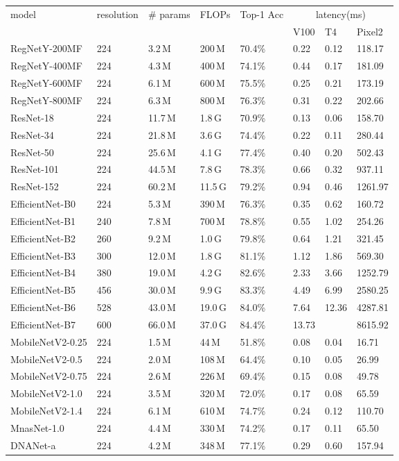 \documentclass{article}
\providecommand{\tabularnewline}{\\}
\providecommand{\tabularnewline}{\\}
\begin{document}
\begin{longtable}[c]{llllllll}
  \toprule 
\multirow{2}{*}{model} & \multirow{2}{*}{resolution} & \multirow{2}{*}{\# params} & \multirow{2}{*}{FLOPs} & \multirow{2}{*}{Top-1 Acc} & \multicolumn{3}{c}{latency(ms)}\tabularnewline
\cmidrule{6-8} \cmidrule{7-8} \cmidrule{8-8} 
 &  &  &  &  & V100 & T4 & Pixel2\tabularnewline
\midrule 
RegNetY-200MF & 224 & 3.2\,M & 200\,M & 70.4\% & 0.22 & 0.12 & 118.17\tabularnewline
\midrule 
RegNetY-400MF & 224 & 4.3\,M & 400\,M & 74.1\% & 0.44 & 0.17 & 181.09\tabularnewline
\midrule 
RegNetY-600MF & 224 & 6.1\,M & 600\,M & 75.5\% & 0.25 & 0.21 & 173.19\tabularnewline
\midrule 
RegNetY-800MF & 224 & 6.3\,M & 800\,M & 76.3\% & 0.31 & 0.22 & 202.66\tabularnewline
\midrule 
ResNet-18 & 224 & 11.7\,M & 1.8\,G & 70.9\% & 0.13 & 0.06 & 158.70\tabularnewline
\midrule 
ResNet-34 & 224 & 21.8\,M & 3.6\,G & 74.4\% & 0.22 & 0.11 & 280.44\tabularnewline
\midrule 
ResNet-50 & 224 & 25.6\,M & 4.1\,G & 77.4\% & 0.40 & 0.20 & 502.43\tabularnewline
\midrule 
ResNet-101 & 224 & 44.5\,M & 7.8\,G & 78.3\% & 0.66 & 0.32 & 937.11\tabularnewline
\midrule 
ResNet-152 & 224 & 60.2\,M & 11.5\,G & 79.2\% & 0.94 & 0.46 & 1261.97\tabularnewline
\midrule 
EfficientNet-B0 & 224 & 5.3\,M & 390\,M & 76.3\% & 0.35 & 0.62 & 160.72\tabularnewline
\midrule 
EfficientNet-B1 & 240 & 7.8\,M & 700\,M & 78.8\% & 0.55 & 1.02 & 254.26\tabularnewline
\midrule 
EfficientNet-B2 & 260 & 9.2\,M & 1.0\,G & 79.8\% & 0.64 & 1.21 & 321.45\tabularnewline
\midrule 
EfficientNet-B3 & 300 & 12.0\,M & 1.8\,G & 81.1\% & 1.12 & 1.86 & 569.30\tabularnewline
\midrule 
EfficientNet-B4 & 380 & 19.0\,M & 4.2\,G & 82.6\% & 2.33 & 3.66 & 1252.79\tabularnewline
\midrule 
EfficientNet-B5 & 456 & 30.0\,M & 9.9\,G & 83.3\% & 4.49 & 6.99 & 2580.25\tabularnewline
\midrule 
EfficientNet-B6 & 528 & 43.0\,M & 19.0\,G & 84.0\% & 7.64 & 12.36 & 4287.81\tabularnewline
\midrule 
EfficientNet-B7 & 600 & 66.0\,M & 37.0\,G & 84.4\% & 13.73 &  & 8615.92\tabularnewline
\midrule 
MobileNetV2-0.25 & 224 & 1.5\,M & 44\,M & 51.8\% & 0.08 & 0.04 & 16.71\tabularnewline
\midrule 
MobileNetV2-0.5 & 224 & 2.0\,M & 108\,M & 64.4\% & 0.10 & 0.05 & 26.99\tabularnewline
\midrule 
MobileNetV2-0.75 & 224 & 2.6\,M & 226\,M & 69.4\% & 0.15 & 0.08 & 49.78\tabularnewline
\midrule 
MobileNetV2-1.0 & 224 & 3.5\,M & 320\,M & 72.0\% & 0.17 & 0.08 & 65.59\tabularnewline
\midrule 
MobileNetV2-1.4 & 224 & 6.1\,M & 610\,M & 74.7\% & 0.24 & 0.12 & 110.70\tabularnewline
\midrule 
MnasNet-1.0 & 224 & 4.4\,M & 330\,M & 74.2\% & 0.17 & 0.11 & 65.50\tabularnewline
\midrule 
DNANet-a & 224 & 4.2\,M & 348\,M & 77.1\% & 0.29 & 0.60 & 157.94\tabularnewline

\end{longtable}
\end{document}
